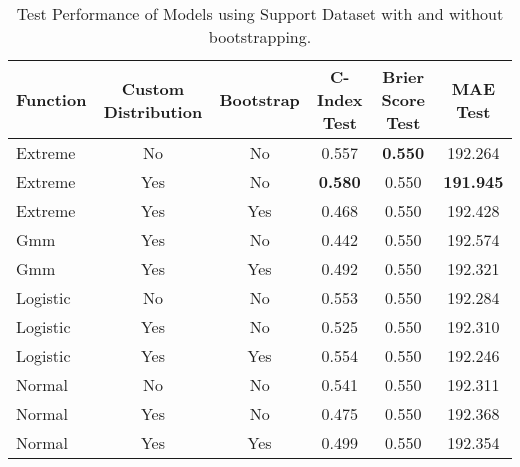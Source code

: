 \begin{table}[h!]
\centering
\caption{Test Performance of Models using Support Dataset with and without bootstrapping.}
\label{tab:test_performance_support_2}
\begin{tabular}{l|c|c|c|c|c}
\hline
\textbf{Function} & \textbf{Custom Distribution} & \textbf{Bootstrap} & \textbf{C-Index Test} & \textbf{Brier Score Test} & \textbf{MAE Test} \\
\hline
Extreme & No & No & 0.557 & \textbf{0.550} & 192.264 \\
Extreme & Yes & No & \textbf{0.580} & 0.550 & \textbf{191.945} \\
Extreme & Yes & Yes & 0.468 & 0.550 & 192.428 \\
Gmm & Yes & No & 0.442 & 0.550 & 192.574 \\
Gmm & Yes & Yes & 0.492 & 0.550 & 192.321 \\
Logistic & No & No & 0.553 & 0.550 & 192.284 \\
Logistic & Yes & No & 0.525 & 0.550 & 192.310 \\
Logistic & Yes & Yes & 0.554 & 0.550 & 192.246 \\
Normal & No & No & 0.541 & 0.550 & 192.311 \\
Normal & Yes & No & 0.475 & 0.550 & 192.368 \\
Normal & Yes & Yes & 0.499 & 0.550 & 192.354 \\
\hline
\end{tabular}
\end{table}
